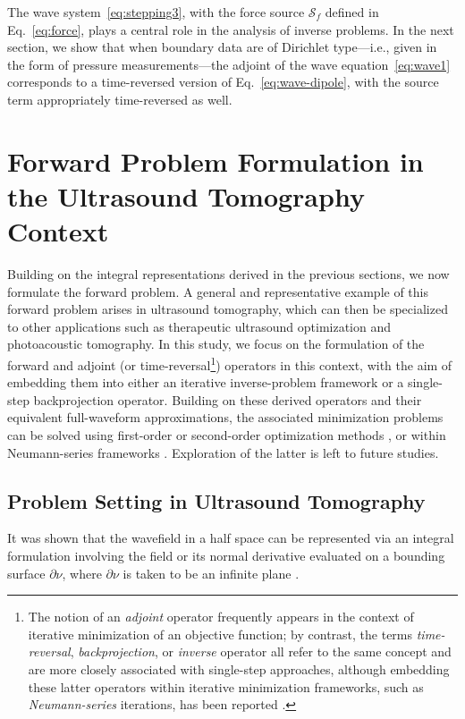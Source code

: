 \documentclass[11pt,reqno]{amsart}
\theoremstyle{remark}
\theoremstyle{italic_lemma}
\begin{document}
The wave system~\eqref{eq:stepping3}, with the force source \( \boldsymbol{\mathcal{S}}_f \) defined in Eq.~\eqref{eq:force}, plays a central role in the analysis of inverse problems. In the next section, we show that when boundary data are of Dirichlet type—i.e., given in the form of pressure measurements—the adjoint of the wave equation~\eqref{eq:wave1} corresponds to a time-reversed version of Eq.~\eqref{eq:wave-dipole}, with the source term appropriately time-reversed as well.



\section{Forward Problem Formulation in the Ultrasound Tomography Context} \label{sec:forward}


Building on the integral representations derived in the previous sections, we now formulate the forward problem. A general and representative example of this forward problem arises in ultrasound tomography, which can then be specialized to other applications such as therapeutic ultrasound optimization and photoacoustic tomography. In this study, we focus on the formulation of the forward and adjoint (or time-reversal\footnote{The notion of an \emph{adjoint} operator frequently appears in the context of iterative minimization of an objective function; by contrast, the terms \emph{time-reversal}, \emph{backprojection}, or \emph{inverse} operator all refer to the same concept and are more closely associated with single-step approaches, although embedding these latter operators within iterative minimization frameworks, such as \emph{Neumann-series} iterations, has been reported \cite{Qian}.
}) operators in this context, with the aim of embedding them into either an iterative inverse-problem framework or a single-step backprojection operator. Building on these derived operators and their equivalent full-waveform approximations, the associated minimization problems can be solved using first-order or second-order optimization methods \cite{Arridge,Haltmeier1,Javaherian1,Javaherian2}, or within Neumann-series frameworks \cite{Qian}. Exploration of the latter is left to future studies.


\subsection{Problem Setting in Ultrasound Tomography}  \label{sec:forward-def}

It was shown that the wavefield in a half space can be represented via an integral formulation involving the field or its normal derivative evaluated on a bounding surface \( \partial \nu \), where \( \partial \nu \) is taken to be an infinite plane \cite{Devaney}.
\end{document}
